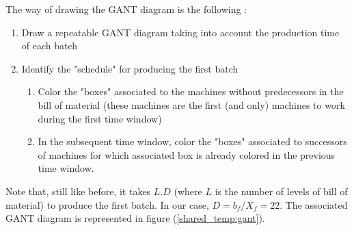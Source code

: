 The way of drawing the GANT diagram is the following : 
\begin{enumerate}
    \item Draw a repeatable GANT diagram taking into account the production time of each batch
    \item Identify the "schedule" for producing the first batch
    \begin{enumerate}
        \item Color the "boxes" associated to the machines without predecessors in the bill of material (these machines are the first (and only) machines to work during the first time window)
        \item In the subsequent time window, color the "boxes" associated to successors of machines for which associated box is already colored in the previous time window.
    \end{enumerate}
\end{enumerate}

Note that, still like before, it takes $L.D$ (where $L$ is the number of levels of bill of material) to produce the first batch. In our case, $D=b_f/X_f=22$. The associated GANT diagram is represented in figure (\ref{shared_temp:gant}).
